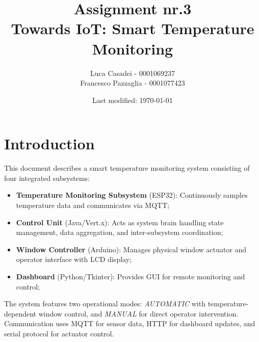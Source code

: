 \documentclass[a4paper]{article}
\author{Luca Casadei - 0001069237\\Francesco Pazzaglia - 0001077423}
\date{Last modified: \today}
\title{\textbf{Assignment nr.3\\Towards IoT: Smart Temperature Monitoring}}
\begin{document}
	\maketitle
	\tableofcontents
	
	\section{Introduction}
	This document describes a smart temperature monitoring system consisting of four integrated subsystems:
	
	\begin{itemize}
		\item \textbf{Temperature Monitoring Subsystem} (ESP32): Continuously samples temperature data and communicates via MQTT;
		\item \textbf{Control Unit} (Java/Vert.x): Acts as system brain handling state management, data aggregation, and inter-subsystem coordination;
		\item \textbf{Window Controller} (Arduino): Manages physical window actuator and operator interface with LCD display;
		\item \textbf{Dashboard} (Python/Tkinter): Provides GUI for remote monitoring and control;
	\end{itemize}
	
	The system features two operational modes: \textit{AUTOMATIC} with temperature-dependent window control, and \textit{MANUAL} for direct operator intervention. Communication uses MQTT for sensor data, HTTP for dashboard updates, and serial protocol for actuator control.
	
	
\end{document}

